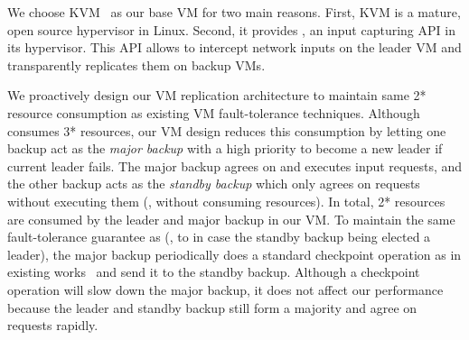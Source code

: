 We choose KVM~\cite{kvm} as our base VM for two main reasons. First, KVM 
is a mature, open source hypervisor in Linux. Second, it provides 
, an input capturing API in its hypervisor. This API allows 
\falcon to intercept network inputs on the leader VM and transparently 
replicates them on backup VMs.

We proactively design our VM replication architecture to maintain same 2* 
resource consumption as existing VM fault-tolerance techniques. Although \paxos 
consumes 3* resources, our VM design reduces this consumption by letting 
one backup act as the \emph{major backup} with a high priority to become a new 
leader if current leader fails. The major backup agrees on and executes input 
requests, and the other backup acts as the \emph{standby backup} which only 
agrees on requests without executing them (\ie, without consuming  
resources). In total, 2* resources are consumed by the leader and major 
backup in our VM. To maintain the same fault-tolerance guarantee as \paxos (\ie, 
to in case the standby backup being elected a leader), the major backup 
periodically does a standard checkpoint operation as in existing 
works~\cite{crane:sosp15,rex:eurosys14} and send it to the standby backup. 
Although a checkpoint operation will slow down the major backup, it does not 
affect our performance because the leader and standby backup still form a 
majority and agree on requests rapidly.





